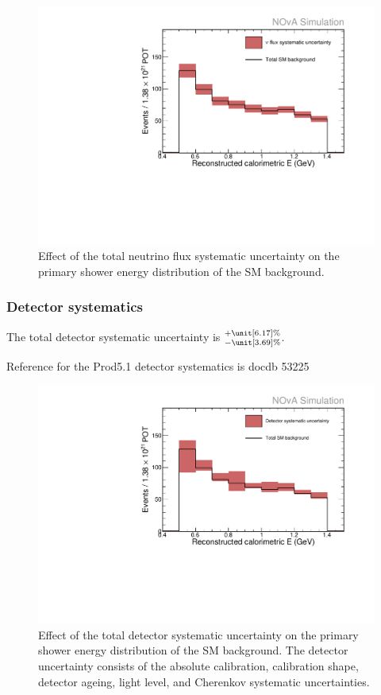 \begin{figure}[hbtp]
\centering
\includegraphics[width=.9\textwidth]{Plots/NuMM/SystShifts_beamSysts_Full_Graph.pdf}
\caption[Neutrino flux systematic uncertainty]{Effect of the total neutrino flux systematic uncertainty on the primary shower energy distribution of the \acrshort{SM} background.}
\label{fig:NuMMFluxSysts}
\end{figure}


\subsubsection*{Detector systematics}

The total detector systematic uncertainty is $^{+\unit[6.17]{\%}}_{-\unit[3.69]{\%}}$.

Reference for the Prod5.1 detector systematics is docdb 53225

\begin{figure}[hbtp]
\centering
\includegraphics[width=.9\textwidth]{Plots/NuMM/SystShifts_detSysts_Full_Graph.pdf}
\caption[Detector systematic uncertainties]{Effect of the total detector systematic uncertainty on the primary shower energy distribution of the \acrshort{SM} background. The detector uncertainty consists of the absolute calibration, calibration shape, detector ageing, light level, and Cherenkov systematic uncertainties.}
\label{fig:NuMMDetSysts}
\end{figure}


